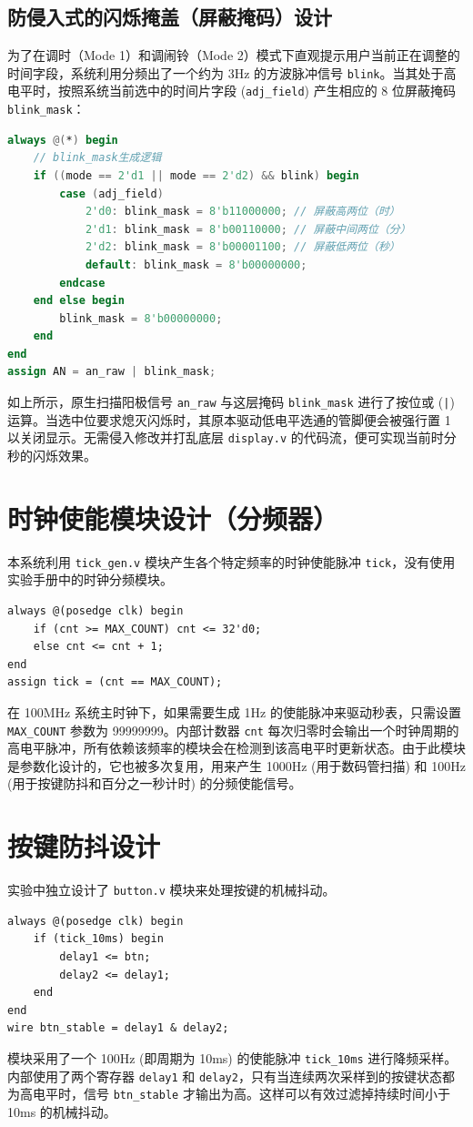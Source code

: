 \documentclass[12pt, a4paper]{ctexart}
\begin{document}
\subsection{防侵入式的闪烁掩盖（屏蔽掩码）设计}
为了在调时（Mode 1）和调闹铃（Mode 2）模式下直观提示用户当前正在调整的时间字段，系统利用分频出了一个约为 3Hz 的方波脉冲信号 \texttt{blink}。当其处于高电平时，按照系统当前选中的时间片字段 (\texttt{adj\_field}) 产生相应的 8 位屏蔽掩码 \texttt{blink\_mask}：
\begin{lstlisting}[language=Verilog]
always @(*) begin
    // blink_mask生成逻辑
    if ((mode == 2'd1 || mode == 2'd2) && blink) begin
        case (adj_field)
            2'd0: blink_mask = 8'b11000000; // 屏蔽高两位（时）
            2'd1: blink_mask = 8'b00110000; // 屏蔽中间两位（分）
            2'd2: blink_mask = 8'b00001100; // 屏蔽低两位（秒）
            default: blink_mask = 8'b00000000;
        endcase
    end else begin
        blink_mask = 8'b00000000;
    end
end
assign AN = an_raw | blink_mask;
\end{lstlisting}
如上所示，原生扫描阳极信号 \texttt{an\_raw} 与这层掩码 \texttt{blink\_mask} 进行了按位或 (\texttt{|}) 运算。当选中位要求熄灭闪烁时，其原本驱动低电平选通的管脚便会被强行置 1 以关闭显示。无需侵入修改并打乱底层 \texttt{display.v} 的代码流，便可实现当前时分秒的闪烁效果。

\section{时钟使能模块设计（分频器）}
本系统利用 \texttt{tick\_gen.v} 模块产生各个特定频率的时钟使能脉冲 \texttt{tick}，没有使用实验手册中的时钟分频模块。
\begin{lstlisting}
always @(posedge clk) begin
    if (cnt >= MAX_COUNT) cnt <= 32'd0;
    else cnt <= cnt + 1;
end
assign tick = (cnt == MAX_COUNT);
\end{lstlisting}
在 100MHz 系统主时钟下，如果需要生成 1Hz 的使能脉冲来驱动秒表，只需设置 \texttt{MAX\_COUNT} 参数为 99999999。内部计数器 \texttt{cnt} 每次归零时会输出一个时钟周期的高电平脉冲，所有依赖该频率的模块会在检测到该高电平时更新状态。由于此模块是参数化设计的，它也被多次复用，用来产生 1000Hz (用于数码管扫描) 和 100Hz (用于按键防抖和百分之一秒计时) 的分频使能信号。

\section{按键防抖设计}
实验中独立设计了 \texttt{button.v} 模块来处理按键的机械抖动。
\begin{lstlisting}
always @(posedge clk) begin
    if (tick_10ms) begin
        delay1 <= btn;
        delay2 <= delay1;
    end
end
wire btn_stable = delay1 & delay2;
\end{lstlisting}
模块采用了一个 100Hz (即周期为 10ms) 的使能脉冲 \texttt{tick\_10ms} 进行降频采样。内部使用了两个寄存器 \texttt{delay1} 和 \texttt{delay2}，只有当连续两次采样到的按键状态都为高电平时，信号 \texttt{btn\_stable} 才输出为高。这样可以有效过滤掉持续时间小于 10ms 的机械抖动。
\end{document}
